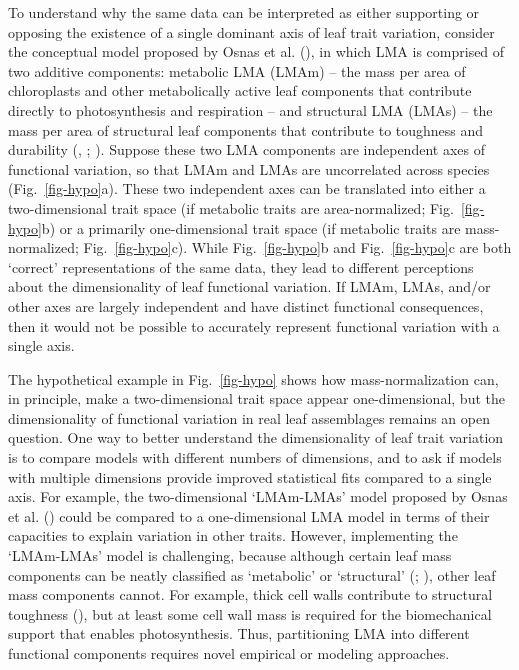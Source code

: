 \documentclass[
  12pt,
  letterpaper,
  DIV=11,
  numbers=noendperiod]{scrartcl}
\begin{document}
To understand why the same data can be interpreted as either supporting
or opposing the existence of a single dominant axis of leaf trait
variation, consider the conceptual model proposed by Osnas et al.
(), in which LMA is comprised of two
additive components: metabolic LMA (LMAm) -- the mass per area of
chloroplasts and other metabolically active leaf components that
contribute directly to photosynthesis and respiration -- and structural
LMA (LMAs) -- the mass per area of structural leaf components that
contribute to toughness and durability
(,
; ). Suppose these two LMA components are independent axes of
functional variation, so that LMAm and LMAs are uncorrelated across
species (Fig.~\ref{fig-hypo}a). These two independent axes can be
translated into either a two-dimensional trait space (if metabolic
traits are area-normalized; Fig.~\ref{fig-hypo}b) or a primarily
one-dimensional trait space (if metabolic traits are mass-normalized;
Fig.~\ref{fig-hypo}c). While Fig.~\ref{fig-hypo}b and
Fig.~\ref{fig-hypo}c are both `correct' representations of the same
data, they lead to different perceptions about the dimensionality of
leaf functional variation. If LMAm, LMAs, and/or other axes are largely
independent and have distinct functional consequences, then it would not
be possible to accurately represent functional variation with a single
axis.

The hypothetical example in Fig.~\ref{fig-hypo} shows how
mass-normalization can, in principle, make a two-dimensional trait space
appear one-dimensional, but the dimensionality of functional variation
in real leaf assemblages remains an open question. One way to better
understand the dimensionality of leaf trait variation is to compare
models with different numbers of dimensions, and to ask if models with
multiple dimensions provide improved statistical fits compared to a
single axis. For example, the two-dimensional `LMAm-LMAs' model proposed
by Osnas et al. () could be compared to a
one-dimensional LMA model in terms of their capacities to explain
variation in other traits. However, implementing the `LMAm-LMAs' model
is challenging, because although certain leaf mass components can be
neatly classified as `metabolic' or `structural'
(;
), other leaf mass
components cannot. For example, thick cell walls contribute to
structural toughness (), but
at least some cell wall mass is required for the biomechanical support
that enables photosynthesis. Thus, partitioning LMA into different
functional components requires novel empirical or modeling approaches.
\end{document}
